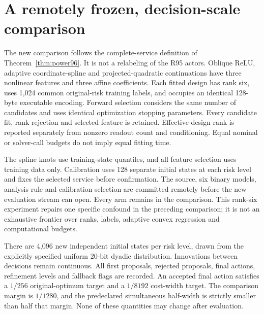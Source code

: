 \section{A remotely frozen, decision-scale comparison}\label{sec:study96}
The new comparison follows the complete-service definition of Theorem~\ref{thm:power96}. It is not a relabeling of the R95 actors. Oblique ReLU, adaptive coordinate-spline and projected-quadratic continuations have three nonlinear features and three affine coefficients. Each fitted design has rank six, uses 1,024 common original-risk training labels, and occupies an identical 128-byte executable encoding. Forward selection considers the same number of candidates and uses identical optimization stopping parameters. Every candidate fit, rank rejection and selected feature is retained. Effective design rank is reported separately from nonzero readout count and conditioning. Equal nominal or solver-call budgets do not imply equal fitting time.

The spline knots use training-state quantiles, and all feature selection uses training data only. Calibration uses 128 separate initial states at each risk level and fixes the selected service before confirmation. The source, six binary models, analysis rule and calibration selection are committed remotely before the new evaluation stream can open. Every arm remains in the comparison. This rank-six experiment repairs one specific confound in the preceding comparison; it is not an exhaustive frontier over ranks, labels, adaptive convex regression and computational budgets.

There are 4,096 new independent initial states per risk level, drawn from the explicitly specified uniform 20-bit dyadic distribution. Innovations between decisions remain continuous. All first proposals, rejected proposals, final actions, refinement levels and fallback flags are recorded. An accepted final action satisfies a $1/256$ original-optimum target and a $1/8192$ cost-width target. The comparison margin is $1/1280$, and the predeclared simultaneous half-width is strictly smaller than half that margin. None of these quantities may change after evaluation.


